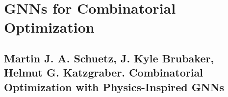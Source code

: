 \documentclass{article}
\begin{document}


\section{GNNs for Combinatorial Optimization}


\subsection{{\sc Martin J. A. Schuetz, J. Kyle Brubaker, Helmut G. Katzgraber}. Combinatorial Optimization with Physics-Inspired GNNs}
\end{document}
